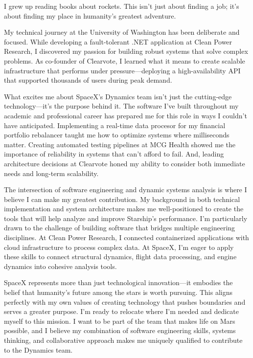I grew up reading books about rockets. This isn't just about finding a job; it's about finding my place in humanity's greatest adventure.

My technical journey at the University of Washington has been deliberate and focused. While developing a fault-tolerant .NET application at Clean Power Research, I discovered my passion for building robust systems that solve complex problems. As co-founder of Clearvote, I learned what it means to create scalable infrastructure that performs under pressure—deploying a high-availability API that supported thousands of users during peak demand.

What excites me about SpaceX's Dynamics team isn't just the cutting-edge technology—it's the purpose behind it. The software I've built throughout my academic and professional career has prepared me for this role in ways I couldn't have anticipated. Implementing a real-time data procesor for my financial portfolio rebalancer taught me how to optimize systems where milliseconds matter. Creating automated testing pipelines at MCG Health showed me the importance of reliability in systems that can't afford to fail. And, leading architecture decisions at Clearvote honed my ability to consider both immediate needs and long-term scalability.

The intersection of software engineering and dynamic systems analysis is where I believe I can make my greatest contribution. My background in both technical implementation and system architecture makes me well-positioned to create the tools that will help analyze and improve Starship's performance. I'm particularly drawn to the challenge of building software that bridges multiple engineering disciplines. At Clean Power Research, I connected containerized applications with cloud infrastructure to process complex data. At SpaceX, I'm eager to apply these skills to connect structural dynamics, flight data processing, and engine dynamics into cohesive analysis tools.

SpaceX represents more than just technological innovation—it embodies the belief that humanity's future among the stars is worth pursuing. This aligns perfectly with my own values of creating technology that pushes boundaries and serves a greater purpose. I'm ready to relocate where I'm needed and dedicate myself to this mission. I want to be part of the team that makes life on Mars possible, and I believe my combination of software engineering skills, systems thinking, and collaborative approach makes me uniquely qualified to contribute to the Dynamics team.